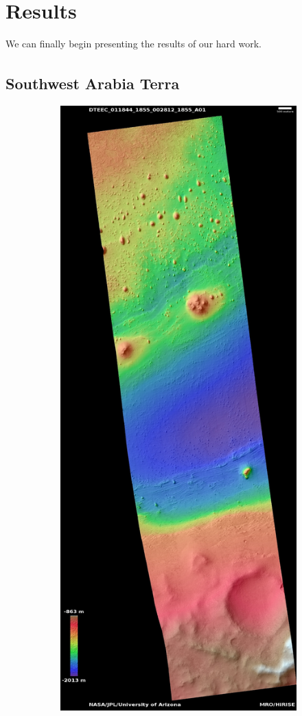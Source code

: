 \documentclass[12pt]{article}
\newcommand{\supcite}[1]{\textsuperscript{\cite{#1}}}
\begin{document}
\section{Results}
\label{sec:results}
\par We can finally begin presenting the results of our hard work.
\subsection{Southwest Arabia Terra\supcite{bib:ESP_011844_1855}}
\label{sub:southwest_arabia_terra}
\begin{figure}[h!]
  \centering
  \begin{subfigure}[t]{0.27\textwidth}
    \centering
    \includegraphics[height=0.4\paperheight]{figures/maps/ESP_011844_1855/DTEEC_011844_1855_002812_1855_A01.jpg}

\end{subfigure}
\end{figure}
\end{document}
